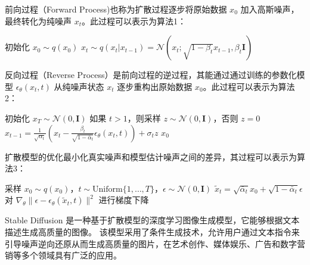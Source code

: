 \documentclass[a4paper,AutoFakeBold,oneside,12pt]{book}
\begin{document}
前向过程（Forward Process)也称为扩散过程逐步将原始数据 \( x_0 \) 加入高斯噪声，最终转化为纯噪声 \( x_t \)。此过程可以表示为算法1：
\begin{algorithm}
    \caption{扩散模型的前向过程}
    \begin{algorithmic}[1]
    \State 初始化 $x_0 \sim q(x_0)$
        \State $x_t \sim q(x_t|x_{t-1}) = \mathcal{N}(x_t; \sqrt{1-\beta_t}x_{t-1}, \beta_t \mathbf{I})$
    \EndFor
    \end{algorithmic}
\end{algorithm}

反向过程（Reverse Process）是前向过程的逆过程，其能通过通过训练的参数化模型 \( \epsilon_\theta(x_t, t) \) 从纯噪声状态 \( x_t \) 逐步重构出原始数据 \( x_0 \)。此过程可以表示为算法2：
\begin{algorithm}
    \caption{扩散模型的反向过程}
    \begin{algorithmic}[1]
    \State 初始化 $x_T \sim \mathcal{N}(0, \mathbf{I})$
        \State 如果 $t > 1$，则采样 $z \sim \mathcal{N}(0, \mathbf{I})$，否则 $z = 0$
        \State $x_{t-1} = \frac{1}{\sqrt{\alpha_t}}\left(x_t - \frac{\beta_t}{\sqrt{1-\bar{\alpha}_t}}\epsilon_\theta(x_t, t)\right) + \sigma_t z$
    \EndFor
    \State \Return $x_0$
    \end{algorithmic}
\end{algorithm}


扩散模型的优化最小化真实噪声和模型估计噪声之间的差异，其过程可以表示为算法3：
\begin{algorithm}
    \caption{扩散模型的优化过程}
    \begin{algorithmic}[1]
    \Repeat
        \State 采样 $x_0 \sim q(x_0)$，$t \sim \text{Uniform}\{1, \dots, T\}$，$\epsilon \sim \mathcal{N}(0, \mathbf{I})$
        \State $\tilde{x}_t = \sqrt{\bar{\alpha}_t}x_0 + \sqrt{1-\bar{\alpha}_t}\epsilon$
        \State 对 $\nabla_\theta \|\epsilon - \epsilon_\theta(\tilde{x}_t, t)\|^2$ 进行梯度下降
    \end{algorithmic}
\end{algorithm}

Stable Diffusion\cite{rombach2022high} 是一种基于扩散模型的深度学习图像生成模型，它能够根据文本描述生成高质量的图像。
该模型采用了条件生成技术，允许用户通过文本指令来引导噪声逆向还原从而生成高质量的图片，在艺术创作、媒体娱乐、广告和数字营销等多个领域具有广泛的应用。
\end{document}
